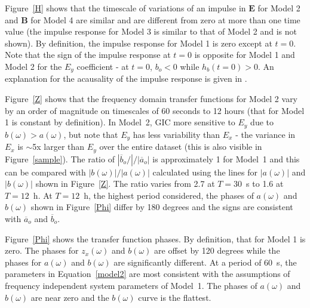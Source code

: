 \documentclass[draft,linenumbers]{agujournal2018}
\begin{document}
Figure~\ref{H} shows that the timescale of variations of an impulse in $\mathbf{E}$ for Model 2 and $\mathbf{B}$ for Model 4 are similar and are different from zero at more than one time value (the impulse response for Model 3 is similar to that of Model 2 and is not shown). By definition, the impulse response for Model 1 is zero except at $t=0$. Note that the sign of the impulse response at $t=0$ is opposite for Model 1 and Model 2 for the $E_y$ coefficient - at $t=0$, $b_o < 0$ while $h_b(t=0)>0$. An explanation for the acausality of the impulse response is given in \cite{Kelbert2017}.

Figure~\ref{Z} shows that the frequency domain transfer functions for Model 2 vary by an order of magnitude on timescales of 60 seconds to 12 hours (that for Model 1 is constant by definition). In Model~2, GIC more sensitive to $E_y$ due to $b(\omega) > a(\omega)$, but note that $E_y$ has less variability than $E_x$ - the variance in $E_x$ is $\sim$5x larger than $E_y$ over the entire dataset (this is also visible in Figure~\ref{sample}). The ratio of $|\overline{b}_o/|/|\overline{a}_o|$ is approximately 1 for Model~1 and this can be compared with $|b(\omega)|/|a(\omega)|$ calculated using the lines for $|a(\omega)|$ and $|b(\omega)|$ shown in Figure~\ref{Z}. The ratio varies from 2.7 at $T=30$~s to 1.6 at $T=12$~h. At $T=12$~h, the highest period considered, the phases of $a(\omega)$ and $b(\omega)$ shown in Figure~\ref{Phi} differ by 180 degrees and the signs are consistent with $\overline{a}_o$ and $\overline{b}_o$. 

Figure~\ref{Phi} shows the transfer function phases. By definition, that for Model 1 is zero. The phases for $z_x(\omega)$ and $b(\omega)$ are offset by 120 degrees while the phases for $a(\omega)$ and $b(\omega)$ are significantly different.  At a period of $60$~s, the parameters in Equation~\ref{model2} are most consistent with the assumptions of frequency independent system parameters of Model~1. The phases of $a(\omega)$ and $b(\omega)$ are near zero and the $b(\omega)$ curve is the flattest.


\end{document}

